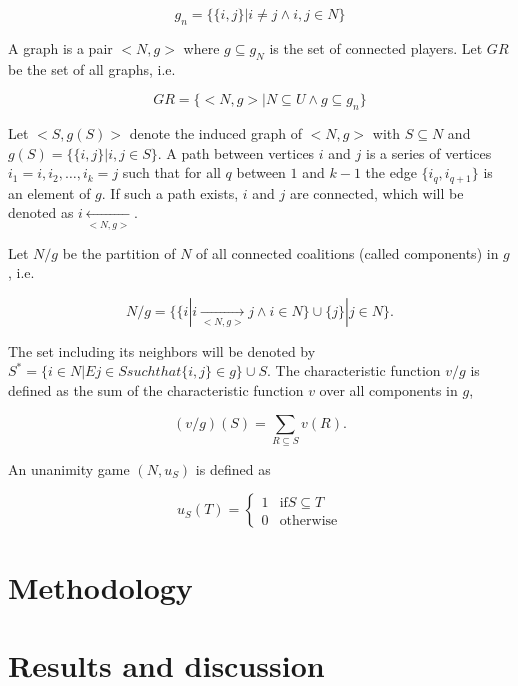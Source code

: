\documentclass[twoside,twocolumn,9pt]{article}
\begin{document}
\begin{equation}
g_n  = \{\{ i, j \} | i \ne j \land i, j \in N \}
\end{equation}

A graph is a pair $<N, g>$ where $g \subseteq g_N$ is the set of connected players.
Let $GR$ be the set of all graphs, i.e. 

\begin{equation}
GR = \{ <N, g> | N \subseteq U \land g \subseteq g_n \}
\end{equation}

Let $<S, g(S)>$ denote the induced graph of $<N, g>$ with $S \subseteq N$ and $g(S) = \{\{i, j \} | i, j \in S\}$.
A path between vertices $i$ and $j$ is a series of vertices $i_1 = i, i_2, \dots, i_k = j$ such that for all $q$ between 
$1$ and $k-1$ the edge $\{i_q, i_{q+1}\}$ is an element of $g$. If such a path exists, $i$ and $j$ are connected, which 
will be denoted as $i \underset{<N, g>}{\leftarrow}$.

Let $N/g$ be the partition of $N$ of all connected coalitions (called components) in $g$, i.e.
 
\begin{equation}
    N/g = \{\{ i | i \underset{<N, g>}{\rightarrow} j \land i \in N \} \cup \{j\} | j \in N \}.
\end{equation}

The set including its neighbors will be denoted by $S^* = \{ i \in N | E j \in S such that \{i, j\} \in g\} \cup S$.
The characteristic function $v/g$ is defined as the sum of the characteristic function $v$ over all components in $g$, 

\begin{equation}
(v/g)(S) = \sum_{R \subseteq S} v(R).
\end{equation}

An unanimity game $(N, u_S)$ is defined as 

\begin{equation}
    u_S(T) = \begin{cases}
        1 & \text{if} S \subseteq T \\
        0 & \text{otherwise}
    \end{cases}
\end{equation}


\section{Methodology}

\section{Results and discussion}
\end{document}
